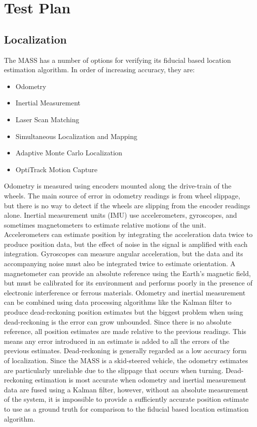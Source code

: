 \section{Test Plan}
\label{sec:scenario}
\subsection{Localization}
\label{see:loctestscenario}
The MASS has a number of options for verifying its fiducial based location estimation algorithm. In order of increasing accuracy, they are:
\begin{itemize}
    \item Odometry
    \item Inertial Measurement
    \item Laser Scan Matching
    \item Simultaneous Localization and Mapping
    \item Adaptive Monte Carlo Localization
    \item OptiTrack Motion Capture
\end{itemize}

Odometry is measured using encoders mounted along the drive-train of the wheels. The main source of error in odometry readings is from wheel slippage, but there is no way to detect if the wheels are slipping from the encoder readings alone. Inertial measurement units (IMU) use accelerometers, gyroscopes, and sometimes magnetometers to estimate relative motions of the unit. Accelerometers can estimate position by integrating the acceleration data twice to produce position data, but the effect of noise in the signal is amplified with each integration. Gyroscopes can measure angular acceleration, but the data and its accompanying noise must also be integrated twice to estimate orientation. A magnetometer can provide an absolute reference using the Earth's magnetic field, but must be calibrated for its environment and performs poorly in the presence of electronic interference or ferrous materials. Odometry and inertial measurement can be combined using data processing algorithms like the Kalman filter to produce dead-reckoning position estimates but the biggest problem when using dead-reckoning is the error can grow unbounded. Since there is no absolute reference, all position estimates are made relative to the previous readings. This means any error introduced in an estimate is added to all the errors of the previous estimates. Dead-reckoning is generally regarded as a low accuracy form of localization. Since the MASS is a skid-steered vehicle, the odometry estimates are particularly unreliable due to the slippage that occurs when turning. Dead-reckoning estimation is most accurate when odometry and inertial measurement data are fused using a Kalman filter, however, without an absolute measurement of the system, it is impossible to provide a sufficiently accurate position estimate to use as a ground truth for comparison to the fiducial based location estimation algorithm.\\

